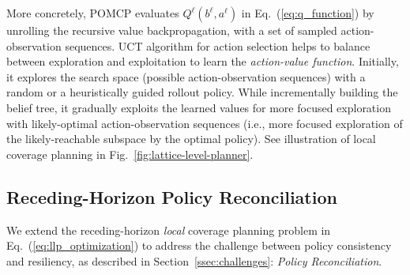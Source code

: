 \documentclass[letterpaper]{article} %
\newcommand{\phdone}[1]{} %
\begin{document}
\phdone{POMCP Details}
More concretely, POMCP evaluates $Q^\ell(b^\ell, a^\ell)$ in Eq.~(\ref{eq:q_function}) by unrolling the recursive value backpropagation, with a set of sampled action-observation sequences.
UCT algorithm for action selection helps to balance between exploration and exploitation to learn the \textit{action-value function}.
Initially, it explores the search space (possible action-observation sequences) with a random or a heuristically guided rollout policy.
While incrementally building the belief tree, it gradually exploits the learned values for more focused exploration with likely-optimal action-observation sequences (i.e., more focused exploration of the likely-reachable subspace by the optimal policy).
See illustration of local coverage planning in Fig.~\ref{fig:lattice-level-planner}.




\subsection{Receding-Horizon Policy Reconciliation} \label{ssec:resilient_rhp}

\phdone{Consistency and Resiliency}
We extend the receding-horizon \textit{local} coverage planning problem
in Eq.~(\ref{eq:llp_optimization}) to address the challenge between policy consistency and resiliency, as described in Section~\ref{ssec:challenges}:
\textit{Policy Reconciliation}.

\end{document}
